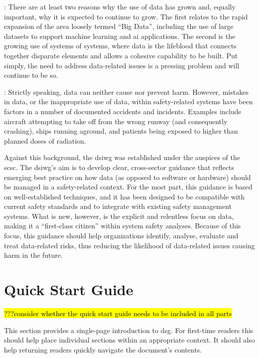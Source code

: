 : There are at least two reasons why the use of data has grown and, equally important, why it is expected to continue to grow. The  first relates to the rapid expansion of the area loosely termed ``Big Data'', including the use of large \glspl{dataset} to support machine learning and \gls{ai} applications. The second is the growing use of systems of systems, where data is the lifeblood that connects together disparate elements and allows a cohesive capability to be built. Put simply, the need to address data-related issues is a pressing problem and will continue to be so.

: Strictly speaking,
data can neither cause nor prevent harm.
However,  mistakes in data, or the inappropriate use of data, within safety-related systems have been factors in a number of documented accidents and incidents. Examples include aircraft attempting to take off from the wrong runway (and consequently crashing), ships running aground, and patients being exposed to higher than planned doses of radiation.

Against this background, the \gls{dsiwg} was established under the auspices of the \gls{scsc}. The \gls{dsiwg}'s aim is to develop clear, cross-sector guidance that reflects emerging best practice on how data (as opposed to software or hardware) should be managed in a safety-related context.
For the most part, this guidance is based on well-established techniques,
and it has been designed to be compatible with current safety standards and to integrate with existing safety management systems.
What is new, however, is the explicit and relentless focus on data, making it a ``first-class citizen'' within system safety analyses.
Because of this focus, this guidance should help organizations identify, analyse, evaluate and treat data-related risks, thus reducing the likelihood of data-related issues causing harm in the future.

\clearpage
\section*{Quick Start Guide}\hl{???consider whether the quick start guide needs to be included in all parts}
\pagestyle{ContinuationPageFrontMatter}


This section provides a single-page introduction to \gls{dsg}. For first-time readers this should help place individual sections within an appropriate context. It should also help returning readers quickly navigate the document's contents.

